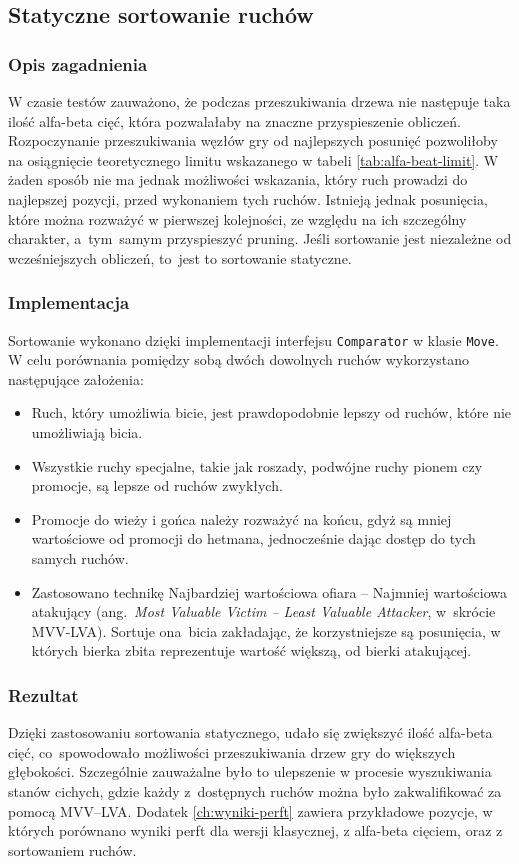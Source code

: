 \subsection{Statyczne sortowanie ruchów}
\label{subsec:sortowanie-ruchow}

\subsubsection{Opis zagadnienia}
W czasie testów zauważono, że podczas przeszukiwania drzewa nie następuje taka ilość alfa-beta cięć, która pozwalałaby na znaczne przyspieszenie obliczeń.
Rozpoczynanie przeszukiwania węzłów gry od najlepszych posunięć pozwoliłoby na osiągnięcie teoretycznego limitu wskazanego w tabeli \ref{tab:alfa-beat-limit}.
W żaden sposób nie ma jednak możliwości wskazania, który ruch prowadzi do najlepszej pozycji, przed wykonaniem tych ruchów.
Istnieją jednak posunięcia, które można rozważyć w pierwszej kolejności, ze względu na ich szczególny charakter, a~tym~samym przyspieszyć pruning.
Jeśli sortowanie jest niezależne od wcześniejszych obliczeń, to~jest to sortowanie statyczne.

\subsubsection{Implementacja}
Sortowanie wykonano dzięki implementacji interfejsu \texttt{Comparator} w klasie \texttt{Move}.
W celu porównania pomiędzy sobą dwóch dowolnych ruchów wykorzystano następujące założenia:
\begin{itemize}
    \item Ruch, który umożliwia bicie, jest prawdopodobnie lepszy od ruchów, które nie umożliwiają bicia.
    \item Wszystkie ruchy specjalne, takie jak roszady, podwójne ruchy pionem czy promocje, są lepsze od ruchów zwykłych.
    \item Promocje do wieży i gońca należy rozważyć na końcu, gdyż są mniej wartościowe od promocji do hetmana, jednocześnie dając dostęp do tych samych ruchów.
    \item Zastosowano technikę Najbardziej wartościowa ofiara – Najmniej wartościowa atakujący (ang.~\emph{Most Valuable Victim – Least Valuable Attacker}, w~skrócie MVV-LVA). Sortuje ona~bicia zakładając, że korzystniejsze są posunięcia, w których bierka zbita reprezentuje wartość większą, od bierki atakującej.
\end{itemize}

\subsubsection{Rezultat}
Dzięki zastosowaniu sortowania statycznego, udało się zwiększyć ilość alfa-beta cięć, co~spowodowało możliwości przeszukiwania drzew gry do większych głębokości.
Szczególnie zauważalne było to ulepszenie w procesie wyszukiwania stanów cichych, gdzie każdy z~dostępnych ruchów można było zakwalifikować za pomocą MVV–LVA.
Dodatek \ref{ch:wyniki-perft} zawiera przykładowe pozycje, w których porównano wyniki perft dla wersji klasycznej, z alfa-beta cięciem, oraz z sortowaniem ruchów.